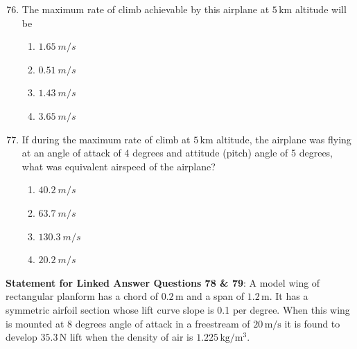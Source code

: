 \documentclass{article}
\begin{document}
\begin{enumerate}
    \setcounter{enumi}{75}
    \item The maximum rate of climb achievable by this airplane at $5 \, \mathrm{km}$ altitude will be
    \begin{multicols}{4}
    \begin{enumerate}
        \item $1.65\ m/s$
        \item $0.51\ m/s$
        \item $1.43\ m/s$
        \item $3.65\ m/s$
    \end{enumerate}
    \end{multicols}
    

    \item If during the maximum rate of climb at $5 \, \mathrm{km}$ altitude, the airplane was flying at an angle of attack of 4 degrees and attitude (pitch) angle of 5 degrees, what was equivalent airspeed of the airplane?
    \begin{multicols}{4}
    \begin{enumerate}
        \item $40.2\ m/s$
        \item $63.7\ m/s$
        \item $130.3\ m/s$
        \item $20.2\ m/s$
    \end{enumerate}
    \end{multicols}
    
\end{enumerate}

\textbf{Statement for Linked Answer Questions 78 \& 79}: A model wing of rectangular planform has a chord of $0.2 \, \mathrm{m}$ and a span of $1.2 \, \mathrm{m}$. It has a symmetric airfoil section whose lift curve slope is 0.1 per degree. When this wing is mounted at 8 degrees angle of attack in a freestream of $20 \, \mathrm{m/s}$ it is found to develop $35.3 \, \mathrm{N}$ lift when the density of air is $1.225 \, \mathrm{kg/m^3}$.
\end{document}
